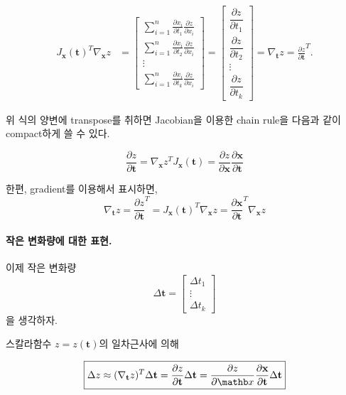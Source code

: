 \documentclass[11pt,a4paper]{article}
\begin{document}
\[
\begin{aligned}
J_{\mathbf x}(\mathbf t)^T\nabla_{\mathbf x}z
&=
\begin{bmatrix}
\displaystyle \sum_{i=1}^{n}\frac{\partial x_i}{\partial t_1}\frac{\partial z}{\partial x_i}\\[1em]
\displaystyle \sum_{i=1}^{n}\frac{\partial x_i}{\partial t_2}\frac{\partial z}{\partial x_i}\\
\vdots\\
\displaystyle \sum_{i=1}^{n}\frac{\partial x_i}{\partial t_k}\frac{\partial z}{\partial x_i}
\end{bmatrix}
=
\begin{bmatrix}
\dfrac{\partial z}{\partial t_1}\\[0.8em]
\dfrac{\partial z}{\partial t_2}\\
\vdots\\
\dfrac{\partial z}{\partial t_k}
\end{bmatrix}
=
\nabla_{\mathbf t}z = \frac{\partial z}{\partial \mathbf{t}}^T.
\end{aligned}
\]

위 식의 양변에 transpose를 취하면 Jacobian을 이용한 chain rule을 다음과 같이 compact하게 쓸 수 있다.

\[\frac{\partial z}{\partial \mathbf t} = \nabla_{\mathbf x}z ^T J_{\mathbf x}(\mathbf t) = \frac{\partial z}{\partial \mathbf x} \frac{\partial \mathbf x}{\partial \mathbf t}  \]

한편, gradient를 이용해서 표시하면,
\[ \nabla_{\mathbf t} z = \frac{\partial z}{\partial \mathbf t}^T =  J_{\mathbf x}(\mathbf t)^T\nabla_{\mathbf x}z = \frac{\partial \mathbf x}{\partial \mathbf t}^T \nabla_{\mathbf x}z \]


\paragraph{작은 변화량에 대한 표현.}

이제 작은 변화량
\[
\Delta\mathbf t
=
\begin{bmatrix}
\Delta t_1\\
\vdots\\
\Delta t_k
\end{bmatrix}
\]
을 생각하자.

스칼라함수 $z=z(\mathbf t)$의 일차근사에 의해

\[
\boxed{
\Delta z
\approx
(\nabla_{\mathbf t}z)^T
\Delta\mathbf t =  \frac{\partial z}{\partial \mathbf{t}} \Delta\mathbf t = \frac{\partial z}{\partial \mathb x}\frac{\partial \mathbf x}{\partial \mathbf t}\Delta \mathbf t
}
\]
\end{document}
